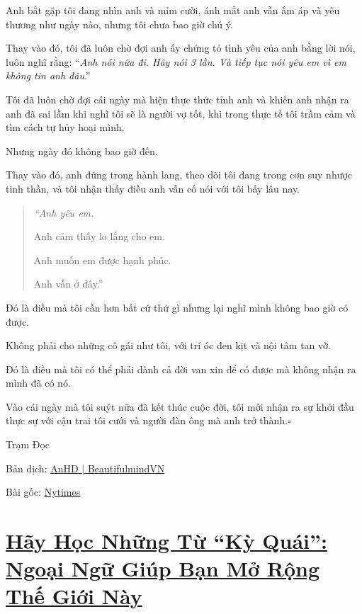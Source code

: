 \documentclass{book}
\numberwithin{equation}{section}
\begin{document}
%
Anh bắt gặp tôi đang nhìn anh và mỉm cười, ánh mắt anh vẫn ấm áp và yêu thương như ngày nào, nhưng tôi chưa bao giờ chú ý.

Thay vào đó, tôi đã luôn chờ đợi anh ấy chứng tỏ tình yêu của anh bằng lời nói, luôn nghĩ rằng: ``\textit{Anh nói nữa đi. Hãy nói 3 lần. Và tiếp tục nói yêu em vì em không tin anh đâu}.''

%
Tôi đã luôn chờ đợi cái ngày mà hiện thực thức tỉnh anh và khiến anh nhận ra anh đã sai lầm khi nghĩ tôi sẽ là người vợ tốt, khi trong thực tế tôi trầm cảm và tìm cách tự hủy hoại mình.

Nhưng ngày đó không bao giờ đến.

%
Thay vào đó, anh đứng trong hành lang, theo dõi tôi đang trong cơn suy nhược tinh thần, và tôi nhận thấy điều anh vẫn cố nói với tôi bấy lâu nay.

\begin{quotation}
    \it
    ``Anh yêu em.
    
    Anh cảm thấy lo lắng cho em.
    
    Anh muốn em được hạnh phúc.
    
    Anh vẫn ở đây.''    
\end{quotation}
Đó là điều mà tôi cần hơn bất cứ thứ gì nhưng lại nghĩ mình không bao giờ có được.

Không phải cho những cô gái như tôi, với trí óc đen kịt và nội tâm tan vỡ.

Đó là điều mà tôi có thể phải dành cả đời van xin để có được mà không nhận ra mình đã có nó.

Vào cái ngày mà tôi suýt nữa đã kết thúc cuộc đời, tôi mới nhận ra sự khởi đầu thực sự với cậu trai tôi cưới và người đàn ông mà anh trở thành.\hfill$\square$

\begin{flushright}
    Trạm Đọc
    
    Bản dịch: \href{https://beautifulmindvn.com/2016/05/11/tro-lai-tu-bo-vuc/}{AnHD | BeautifulmindVN}
    
    Bài gốc: \href{https://www.nytimes.com/2015/06/07/style/crawling-back-from-the-ledge.html?_r=2}{Nytimes}
\end{flushright}


\chapter{\href{http://tramdoc.vn/tin-tuc/hay-hoc-nhung-tu-ky-quai-ngoai-ngu-giup-ban-mo-rong-the-gioi-nay-nDdaOW.html}{Hãy Học Những Từ ``Kỳ Quái'': Ngoại Ngữ Giúp Bạn Mở Rộng Thế Giới Này}}
\end{document}
